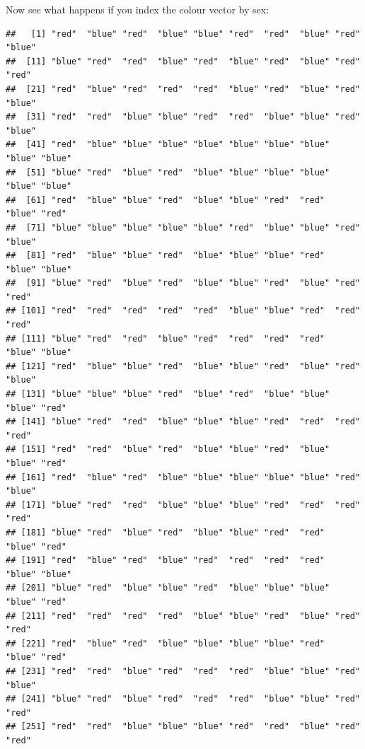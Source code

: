 \documentclass[
]{book}
\newenvironment{Shaded}{\begin{snugshade}}{\end{snugshade}}
\newcommand{\FunctionTok}[1]{\textcolor[rgb]{0.13,0.29,0.53}{\textbf{#1}}}
\newcommand{\NormalTok}[1]{#1}
\newcommand{\SpecialCharTok}[1]{\textcolor[rgb]{0.81,0.36,0.00}{\textbf{#1}}}
\newcommand{\StringTok}[1]{\textcolor[rgb]{0.31,0.60,0.02}{#1}}
\begin{document}
Now see what happens if you index the colour vector by sex:

\begin{Shaded}
\end{Shaded}

\begin{verbatim}
##   [1] "red"  "blue" "red"  "blue" "blue" "red"  "red"  "blue" "red"  "blue"
##  [11] "blue" "red"  "red"  "blue" "red"  "blue" "red"  "blue" "red"  "red" 
##  [21] "red"  "blue" "red"  "red"  "red"  "blue" "red"  "blue" "red"  "blue"
##  [31] "red"  "red"  "blue" "blue" "red"  "red"  "blue" "blue" "red"  "blue"
##  [41] "red"  "blue" "blue" "blue" "blue" "blue" "blue" "blue" "blue" "blue"
##  [51] "blue" "red"  "blue" "red"  "blue" "blue" "blue" "blue" "blue" "blue"
##  [61] "red"  "blue" "blue" "red"  "blue" "blue" "red"  "red"  "blue" "red" 
##  [71] "blue" "blue" "blue" "blue" "blue" "red"  "blue" "blue" "red"  "blue"
##  [81] "red"  "blue" "blue" "red"  "blue" "blue" "blue" "red"  "blue" "blue"
##  [91] "blue" "red"  "blue" "red"  "blue" "blue" "red"  "blue" "red"  "red" 
## [101] "red"  "red"  "red"  "red"  "red"  "blue" "blue" "red"  "red"  "red" 
## [111] "blue" "red"  "red"  "blue" "red"  "red"  "red"  "red"  "blue" "blue"
## [121] "red"  "blue" "blue" "red"  "blue" "blue" "red"  "blue" "red"  "blue"
## [131] "blue" "blue" "blue" "red"  "blue" "red"  "blue" "blue" "blue" "red" 
## [141] "blue" "red"  "red"  "blue" "blue" "blue" "red"  "red"  "red"  "red" 
## [151] "red"  "red"  "blue" "red"  "blue" "blue" "red"  "blue" "blue" "red" 
## [161] "red"  "blue" "red"  "blue" "blue" "blue" "blue" "blue" "red"  "blue"
## [171] "blue" "red"  "red"  "blue" "blue" "blue" "red"  "red"  "red"  "red" 
## [181] "blue" "red"  "blue" "red"  "blue" "blue" "red"  "red"  "blue" "red" 
## [191] "red"  "blue" "red"  "blue" "red"  "red"  "red"  "red"  "blue" "blue"
## [201] "blue" "red"  "blue" "blue" "red"  "blue" "blue" "blue" "blue" "red" 
## [211] "red"  "red"  "red"  "red"  "blue" "blue" "red"  "blue" "red"  "red" 
## [221] "red"  "blue" "red"  "blue" "blue" "blue" "blue" "red"  "blue" "red" 
## [231] "red"  "red"  "blue" "red"  "red"  "red"  "blue" "blue" "red"  "blue"
## [241] "blue" "red"  "blue" "red"  "red"  "red"  "blue" "blue" "red"  "red" 
## [251] "red"  "red"  "blue" "blue" "blue" "red"  "red"  "blue" "red"  "red" 

\end{verbatim}
\end{document}
